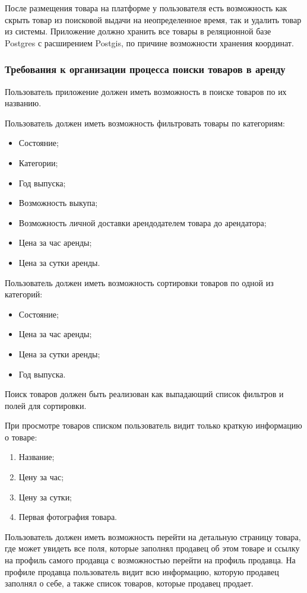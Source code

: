 После размещения товара на платформе у пользователя есть возможность как скрыть товар из поисковой выдачи на неопределенное время, так и удалить товар из системы.
Приложение должно хранить все товары в реляционной базе Postgres с расширением Postgis, по причине возможности хранения координат.

\subsubsection{Требования к организации процесса поиски товаров в аренду}\hfill
Пользователь приложение должен иметь возможность в поиске товаров по их названию.

Пользователь должен иметь возможность фильтровать товары по категориям:
\begin{itemize}
    \item Состояние;
    \item Категории;
    \item Год выпуска;
    \item Возможность выкупа;
    \item Возможность личной доставки арендодателем товара до арендатора;
    \item Цена за час аренды;
    \item Цена за сутки аренды.
\end{itemize}

Пользователь должен иметь возможность сортировки товаров по одной из категорий:
\begin{itemize}
    \item Состояние;
    \item Цена за час аренды;
    \item Цена за сутки аренды;
    \item Год выпуска.
\end{itemize}

Поиск товаров должен быть реализован как выпадающий список фильтров и полей для сортировки.

При просмотре товаров списком пользователь видит только краткую информацию о товаре:
\begin{enumerate}[label=\arabic*)]
    \item Название;
    \item Цену за час;
    \item Цену за сутки;
    \item Первая фотография товара.
\end{enumerate}

Пользователь должен иметь возможность перейти на детальную страницу товара, где может увидеть все поля, которые заполнял продавец об этом товаре и ссылку на профиль самого продавца с возможностью перейти на профиль продавца.
На профиле продавца пользователь видит всю информацию, которую продавец заполнял о себе, а также список товаров, которые продавец продает.


